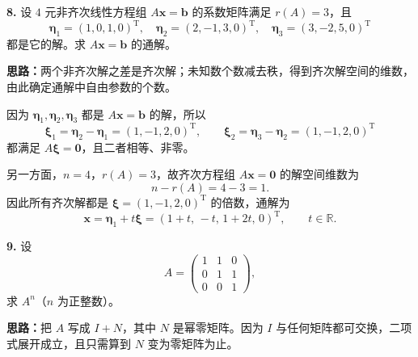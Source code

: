 \else \answerarea[10] \fi%

\textbf{8.} 设 \(4\) 元非齐次线性方程组 \(A\boldsymbol x=\boldsymbol b\) 的系数矩阵满足 \(r(A)=3\)，且
\[
\boldsymbol\eta_1=(1,0,1,0)^{\mathrm T},\quad
\boldsymbol\eta_2=(2,-1,3,0)^{\mathrm T},\quad
\boldsymbol\eta_3=(3,-2,5,0)^{\mathrm T}
\]
都是它的解。求 \(A\boldsymbol x=\boldsymbol b\) 的通解。

\ifshowsolutions%
\textbf{思路：}两个非齐次解之差是齐次解；未知数个数减去秩，得到齐次解空间的维数，由此确定通解中自由参数的个数。

因为 \(\boldsymbol\eta_1,\boldsymbol\eta_2,\boldsymbol\eta_3\) 都是 \(A\boldsymbol x=\boldsymbol b\) 的解，所以
\[
\boldsymbol\xi_1=\boldsymbol\eta_2-\boldsymbol\eta_1=(1,-1,2,0)^{\mathrm T},\qquad
\boldsymbol\xi_2=\boldsymbol\eta_3-\boldsymbol\eta_2=(1,-1,2,0)^{\mathrm T}
\]
都满足 \(A\boldsymbol\xi=\boldsymbol 0\)，且二者相等、非零。

另一方面，\(n=4\)，\(r(A)=3\)，故齐次方程组 \(A\boldsymbol x=\boldsymbol 0\) 的解空间维数为
\[
n-r(A)=4-3=1.
\]
因此所有齐次解都是 \(\boldsymbol\xi=(1,-1,2,0)^{\mathrm T}\) 的倍数，通解为
\[
\boldsymbol x=\boldsymbol\eta_1+t\boldsymbol\xi
=(1+t,\,-t,\,1+2t,\,0)^{\mathrm T},\qquad t\in\mathbb R.
\]

\else \answerarea[8] \fi%

\textbf{9.} 设
\[
A=\begin{pmatrix}1&1&0\\0&1&1\\0&0&1\end{pmatrix},
\]
求 \(A^n\)（\(n\) 为正整数）。

\ifshowsolutions%
\textbf{思路：}把 \(A\) 写成 \(I+N\)，其中 \(N\) 是幂零矩阵。因为 \(I\) 与任何矩阵都可交换，二项式展开成立，且只需算到 \(N\) 变为零矩阵为止。

